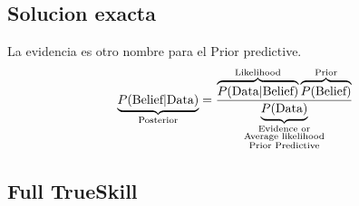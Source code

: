 \documentclass[article]{jss}
\newcommand\hfrac[2]{\genfrac{}{}{0pt}{}{#1}{#2}} %
\begin{document}
\subsection{Solucion exacta}



La evidencia es otro nombre para el Prior predictive.
%
\begin{equation*}
\underbrace{P(\text{Belief}|\text{Data})}_{\text{\scriptsize Posterior}} = \frac{\overbrace{P(\text{Data}|\text{Belief})}^{\text{\scriptsize Likelihood}} \overbrace{P(\text{Belief})}^{\text{\scriptsize Prior}} }{\underbrace{P(\text{Data})}_{\hfrac{\hfrac{\text{\scriptsize Evidence or}}{\text{\scriptsize Average likelihood}}}{\text{\scriptsize Prior Predictive}} } }
\end{equation*}













\subsection{Full TrueSkill}
\end{document}
